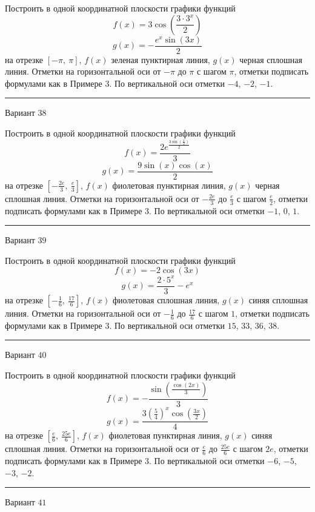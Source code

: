 \documentclass[11pt]{report}
\begin{document}
Построить в одной координатной плоскости графики функций $$f(x) = 3 \cos{\left(\frac{3 \cdot 3^{x}}{2} \right)}$$ $$g(x) = - \frac{e^{x} \sin{\left(3 x \right)}}{2}$$ на отрезке $\left[- \pi, \  \pi\right]$, $f(x)$ зеленая пунктирная линия, $g(x)$ черная сплошная линия. Отметки на горизонтальной оси от $- \pi$ до $\pi$ с шагом $\pi$, отметки подписать формулами как в Примере 3. По вертикальной оси отметки $-4$, $-2$, $-1$.
\begin{center}
\noindent\rule{8cm}{0.4pt}
\end{center}
Вариант $38$


Построить в одной координатной плоскости графики функций $$f(x) = \frac{2 e^{\frac{3 \sin{\left(\frac{x}{2} \right)}}{2}}}{3}$$ $$g(x) = \frac{9 \sin{\left(x \right)} \cos{\left(x \right)}}{2}$$ на отрезке $\left[- \frac{2 e}{3}, \  \frac{e}{3}\right]$, $f(x)$ фиолетовая пунктирная линия, $g(x)$ черная сплошная линия. Отметки на горизонтальной оси от $- \frac{2 e}{3}$ до $\frac{e}{3}$ с шагом $\frac{e}{2}$, отметки подписать формулами как в Примере 3. По вертикальной оси отметки $-1$, $0$, $1$.
\begin{center}
\noindent\rule{8cm}{0.4pt}
\end{center}
Вариант $39$


Построить в одной координатной плоскости графики функций $$f(x) = - 2 \cos{\left(3 x \right)}$$ $$g(x) = \frac{2 \cdot 5^{x}}{3} - e^{x}$$ на отрезке $\left[- \frac{1}{6}, \  \frac{17}{6}\right]$, $f(x)$ фиолетовая сплошная линия, $g(x)$ синяя сплошная линия. Отметки на горизонтальной оси от $- \frac{1}{6}$ до $\frac{17}{6}$ с шагом $1$, отметки подписать формулами как в Примере 3. По вертикальной оси отметки $15$, $33$, $36$, $38$.
\begin{center}
\noindent\rule{8cm}{0.4pt}
\end{center}
Вариант $40$


Построить в одной координатной плоскости графики функций $$f(x) = - \frac{\sin{\left(\frac{\cos{\left(2 x \right)}}{3} \right)}}{3}$$ $$g(x) = \frac{3 \left(\frac{5}{4}\right)^{x} \cos{\left(\frac{3 x}{2} \right)}}{4}$$ на отрезке $\left[\frac{e}{6}, \  \frac{25 e}{6}\right]$, $f(x)$ фиолетовая пунктирная линия, $g(x)$ синяя сплошная линия. Отметки на горизонтальной оси от $\frac{e}{6}$ до $\frac{25 e}{6}$ с шагом $2 e$, отметки подписать формулами как в Примере 3. По вертикальной оси отметки $-6$, $-5$, $-3$, $-2$.
\begin{center}
\noindent\rule{8cm}{0.4pt}
\end{center}
Вариант $41$
\end{document}
